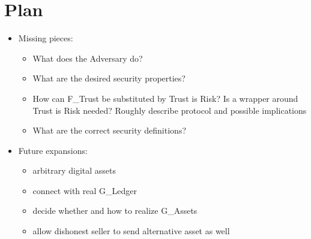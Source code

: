 \section{Plan}
\label{sec:plan}
  \begin{itemize}
    \item Missing pieces:
    \begin{itemize}
      \item What does the Adversary do?
      \item What are the desired security properties?
      \item How can F\_Trust be substituted by Trust is Risk? Is a wrapper around Trust is
      Risk needed? Roughly describe protocol and possible implications
      \item What are the correct security definitions?
    \end{itemize}
    \item Future expansions:
    \begin{itemize}
      \item arbitrary digital assets
      \item connect with real G\_Ledger
      \item decide whether and how to realize G\_Assets
      \item allow dishonest seller to send alternative asset as well
    \end{itemize}
  \end{itemize}
